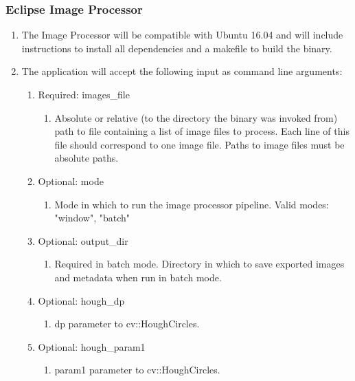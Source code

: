 \documentclass[10pt, onecolumn, draftclsnofoot, letterpaper, compsoc]{IEEEtran}
\begin{document}
\subsubsection{Eclipse Image Processor}
	\begin{enumerate}
		\item The Image Processor will be compatible with Ubuntu 16.04 and
		 will include instructions to install all dependencies and a makefile to
         build the binary.

		 \item The application will accept the following input as command line
		 arguments:
		 \begin{enumerate}
		 	\item Required: images\_file
		 		\begin{enumerate}
		 			\item Absolute or relative (to the directory the binary was
		 			invoked from) path to file containing a list of image files to
                    process. Each line of this file should correspond to one image file.
                    Paths to image files must be absolute paths.
		 		\end{enumerate}

            \item Optional: mode
                \begin{enumerate}
                    \item Mode in which to run the image processor pipeline. Valid modes: "window", "batch"
                \end{enumerate}

		 	\item Optional: output\_dir
		 		\begin{enumerate}
		 			\item  Required in batch mode. Directory in which to save exported images and metadata when run in batch mode.
		 		\end{enumerate}

		 	\item Optional: hough\_dp
		 		\begin{enumerate}
		 			\item dp parameter to cv::HoughCircles.
		 		\end{enumerate}

            \item Optional: hough\_param1
		 		\begin{enumerate}
		 			\item param1 parameter to cv::HoughCircles.
		 		\end{enumerate}


\end{enumerate}
\end{enumerate}
\end{document}
